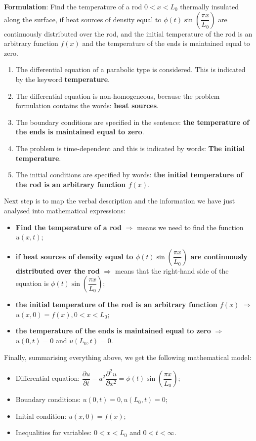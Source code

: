{\bfseries Formulation}: Find the temperature of a rod $0<x<L_{0}$ thermally insulated along the surface, if heat sources of density equal to $\phi(t)\sin\left(\dfrac{\pi x}{L_{0}}\right)$ are continuously distributed over the rod, and the initial temperature of the rod is an arbitrary function $f(x)$ and the temperature of the ends is maintained equal to zero.
\begin{enumerate}
\item The differential equation of a parabolic type is considered. This is indicated by the keyword {\bfseries temperature}.
\item The differential equation is non-homogeneous, because the problem formulation contains the words: {\bfseries heat sources}.
\item The boundary conditions are specified in the sentence: {\bfseries the temperature of the ends is maintained equal to zero}.
\item The problem is time-dependent and this is indicated by words: {\bfseries The initial temperature}.
\item The initial conditions are specified by words: {\bfseries the initial temperature of the rod is an arbitrary function $f(x)$}.
\end{enumerate}
Next step is to map the verbal description and the information we have just analysed into mathematical expressions:
\begin{itemize}
\item {\bfseries Find the temperature of a rod} $\Longrightarrow$ means we need to find the function $u(x,t)$;
\item {\bfseries if heat sources of density equal to $\phi(t)\sin\left(\dfrac{\pi x}{L_{0}}\right)$ are continuously distributed over the rod} $\Longrightarrow$ means that the right-hand side of the equation is $\phi(t)\sin\left(\dfrac{\pi x}{L_{0}}\right)$;
\item {\bfseries the initial temperature of the rod is an arbitrary function $f(x)$} $\Longrightarrow$ $u(x,0)=f(x), 0<x<L_{0}$;
\item {\bfseries the temperature of the ends is maintained equal to zero} $\Longrightarrow$ $u(0,t)=0$ and $u(L_{0},t)=0$.
\end{itemize}
Finally, summarising everything above, we get the following mathematical model:
\begin{itemize}
\item Differential equation: $\dfrac{\partial u}{\partial t} - a^{2}\dfrac{\partial^{2} u}{\partial x^{2}}=\phi(t)\sin\left(\dfrac{\pi x}{L_{0}}\right)$;
\item Boundary conditions: $u(0,t)=0, u(L_{0},t)=0$;
\item Initial condition: $u(x,0)=f(x)$;
\item Inequalities for variables: $0<x<L_{0}$ and $0<t<\infty$.
\end{itemize}

